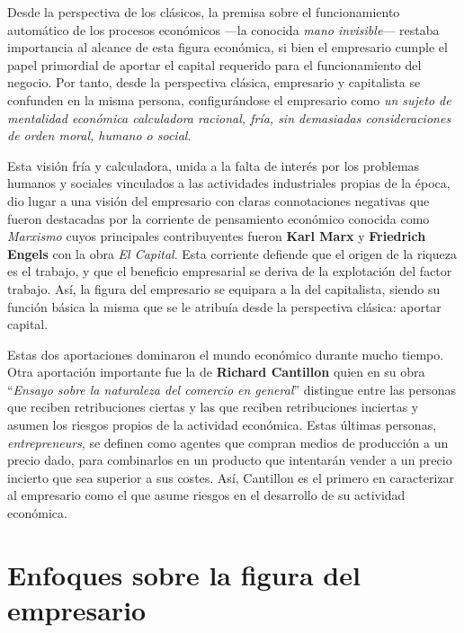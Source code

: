 \documentclass[12pt,a4paper,spanish]{report}
\begin{document}
		Desde la perspectiva de los clásicos, la premisa sobre el funcionamiento automático de los procesos económicos ---la conocida \textcolor[rgb]{0.9,0.3,0.3}{\emph{mano invisible}}--- restaba importancia al alcance de esta figura económica, si bien el empresario cumple el papel primordial de aportar el capital requerido para el funcionamiento del negocio. Por tanto, desde la perspectiva clásica, empresario y capitalista se confunden en la misma persona, configurándose el empresario como \textcolor[rgb]{0.9,0.3,0.3}{\emph{un sujeto de mentalidad económica calculadora racional, fría, sin demasiadas consideraciones de orden moral, humano o social}}.

		Esta visión fría y calculadora, unida a la falta de interés por los problemas humanos y sociales vinculados a las actividades industriales propias de la época, dio lugar a una visión del empresario con claras connotaciones negativas que fueron destacadas por la corriente de pensamiento económico conocida como \textcolor[rgb]{0.9,0.3,0.3}{\emph{Marxismo}} cuyos principales contribuyentes fueron \textbf{Karl Marx} y \textbf{Friedrich Engels} con la obra \textcolor[rgb]{0.9,0.3,0.3}{\emph{El Capital}}. Esta corriente defiende que el origen de la riqueza es el trabajo, y que el beneficio empresarial se deriva de la explotación del factor trabajo. Así, la figura del empresario se equipara a la del capitalista, siendo su función básica la misma que se le atribuía desde la perspectiva clásica: aportar capital.

		Estas dos aportaciones dominaron el mundo económico durante mucho tiempo. Otra aportación importante fue la de \textbf{Richard Cantillon} quien en su obra ``\textcolor[rgb]{0.9,0.3,0.3}{\emph{Ensayo sobre la naturaleza del comercio en general}}'' distingue entre las personas que reciben retribuciones ciertas y las que reciben retribuciones inciertas y asumen los riesgos propios de la actividad económica. Estas últimas personas, \textcolor[rgb]{0.9,0.3,0.3}{\emph{entrepreneurs}}, se definen como agentes que compran medios de producción a un precio dado, para combinarlos en un producto que intentarán vender a un precio incierto que sea superior a sus costes. Así, Cantillon es el primero en caracterizar al empresario como el que asume riesgos en el desarrollo de su actividad económica.

	\section{\textcolor[rgb]{0.9,0.3,0.3}Enfoques sobre la figura del empresario}
\end{document}
